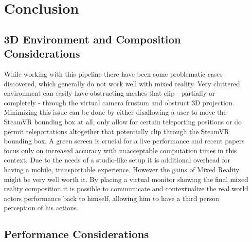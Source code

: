 %
\chapter{Conclusion}


\section{3D Environment and Composition Considerations}

While working with this pipeline there have been some problematic cases 
discovered, which generally do not work well with mixed reality. Very cluttered 
environment can easily have obstructing meshes that clip - partially or 
completely - through the virtual camera frustum and obstruct 3D projection. 
Minimizing this issue can be done by either disallowing a user to move the 
SteamVR bounding box at all, only allow for certain teleporting positions or do 
permit teleportations altogether that potentially clip through the SteamVR 
bounding box.
\newline
A green screen is crucial for a live performance and recent papers focus only 
on increased accuracy with unacceptable computation times in this context. Due 
to the needs of a studio-like setup it is additional overhead for having a 
mobile, transportable experience. However the gains of Mixed Reality might be 
very well worth it. 
\newline
By placing a virtual monitor showing the final mixed reality composition it is 
possible to communicate and contextualize the real world actors performance 
back to himself, allowing him to have a third person perception of his actions.

\section{Performance Considerations}

